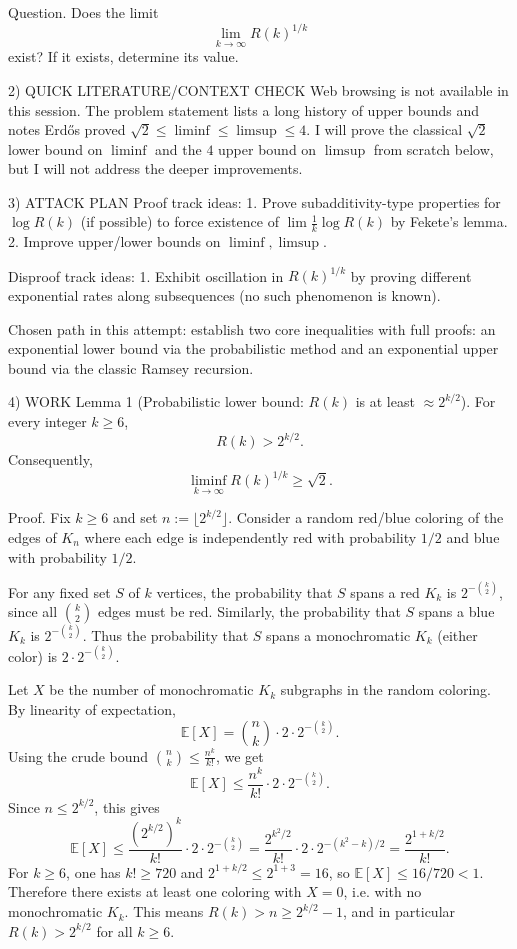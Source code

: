 Question.
Does the limit
\[\lim_{k\to\infty} R(k)^{1/k}\]
exist? If it exists, determine its value.

2) QUICK LITERATURE/CONTEXT CHECK
Web browsing is not available in this session.
The problem statement lists a long history of upper bounds and notes Erd\H{o}s proved $\sqrt2\le\liminf\le\limsup\le 4$.
I will prove the classical $\sqrt2$ lower bound on $\liminf$ and the $4$ upper bound on $\limsup$ from scratch below, but I will not address the deeper improvements.

3) ATTACK PLAN
Proof track ideas:
1. Prove subadditivity-type properties for $\log R(k)$ (if possible) to force existence of $\lim \frac{1}{k}\log R(k)$ by Fekete's lemma.
2. Improve upper/lower bounds on $\liminf,\limsup$.

Disproof track ideas:
1. Exhibit oscillation in $R(k)^{1/k}$ by proving different exponential rates along subsequences (no such phenomenon is known).

Chosen path in this attempt: establish two core inequalities with full proofs:
an exponential lower bound via the probabilistic method and an exponential upper bound via the classic Ramsey recursion.

4) WORK
Lemma 1 (Probabilistic lower bound: $R(k)$ is at least $\approx 2^{k/2}$).
For every integer $k\ge 6$,
\[R(k) > 2^{k/2}.\]
Consequently,
\[\liminf_{k\to\infty} R(k)^{1/k} \ge \sqrt{2}.\]

Proof.
Fix $k\ge 6$ and set $n:=\lfloor 2^{k/2}\rfloor$.
Consider a random red/blue coloring of the edges of $K_n$ where each edge is independently red with probability $1/2$ and blue with probability $1/2$.

For any fixed set $S$ of $k$ vertices, the probability that $S$ spans a red $K_k$ is $2^{-\binom{k}{2}}$, since all $\binom{k}{2}$ edges must be red.
Similarly, the probability that $S$ spans a blue $K_k$ is $2^{-\binom{k}{2}}$.
Thus the probability that $S$ spans a monochromatic $K_k$ (either color) is $2\cdot 2^{-\binom{k}{2}}$.

Let $X$ be the number of monochromatic $K_k$ subgraphs in the random coloring.
By linearity of expectation,
\[\mathbb E[X]=\binom{n}{k}\cdot 2\cdot 2^{-\binom{k}{2}}.\]
Using the crude bound $\binom{n}{k}\le \frac{n^k}{k!}$, we get
\[\mathbb E[X]\le \frac{n^k}{k!}\cdot 2\cdot 2^{-\binom{k}{2}}.\]
Since $n\le 2^{k/2}$, this gives
\[\mathbb E[X]\le \frac{(2^{k/2})^k}{k!}\cdot 2\cdot 2^{-\binom{k}{2}}
=\frac{2^{k^2/2}}{k!}\cdot 2\cdot 2^{-(k^2-k)/2}
=\frac{2^{1+k/2}}{k!}.\]
For $k\ge 6$, one has $k!\ge 720$ and $2^{1+k/2}\le 2^{1+3}=16$, so $\mathbb E[X]\le 16/720<1$.
Therefore there exists at least one coloring with $X=0$, i.e. with no monochromatic $K_k$.
This means $R(k)>n\ge 2^{k/2}-1$, and in particular $R(k)>2^{k/2}$ for all $k\ge 6$.

